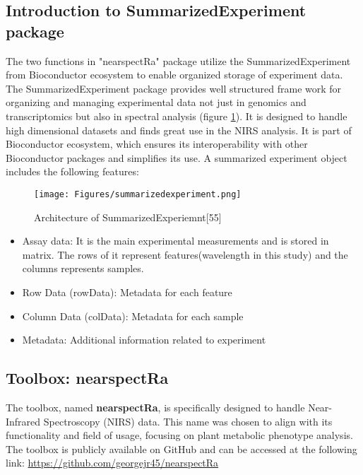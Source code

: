 \documentclass[12pt,a4paper]{report}
\begin{document}
\subsection{Introduction to SummarizedExperiment package}
The two functions in "nearspectRa" package utilize the SummarizedExperiment from Bioconductor ecosystem to enable organized storage of experiment data. The SummarizedExperiment package provides well structured frame work for organizing and managing experimental data not just in genomics and transcriptomics but also in spectral analysis (figure \ref{fig:summarizedexperiment}). It is designed to handle high dimensional datasets and finds great use in the NIRS analysis. It is part of Bioconductor ecosystem, which ensures its interoperability with other Bioconductor packages and simplifies its use. A summarized experiment object includes the following features:

\begin{figure}[h]
    \centering
    \texttt{[image: Figures/summarizedexperiment.png]}
    \caption{Architecture of SummarizedExperiemnt[55]}
    \label{fig:summarizedexperiment}
\end{figure}

\begin{itemize}
    \item Assay data: It is the main experimental measurements and is stored in matrix. The rows of it represent features(wavelength in this study) and the columns represents samples.
    \item Row Data (rowData): Metadata for each feature
    \item Column Data (colData): Metadata for each sample
    \item Metadata: Additional information related to experiment
\end{itemize}


\subsection{Toolbox: nearspectRa}

The toolbox, named \textbf{nearspectRa}, is specifically designed to handle  Near-Infrared Spectroscopy (NIRS) data. This name was chosen to align with its functionality and field of usage, focusing on plant metabolic phenotype analysis. The toolbox is publicly available on GitHub and can be accessed at the following link: \url{https://github.com/georgejr45/nearspectRa}\\
\end{document}
